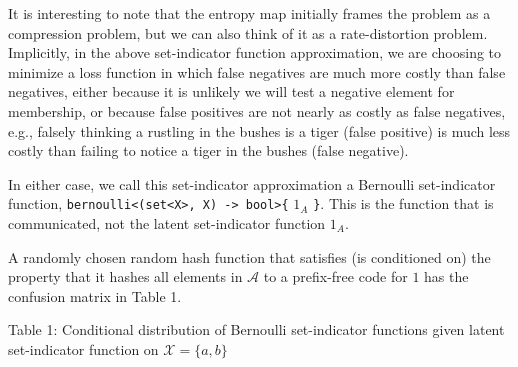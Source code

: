 \documentclass[
]{article}
\begin{document}
It is interesting to note that the entropy map initially frames the
problem as a compression problem, but we can also think of it as a
rate-distortion problem. Implicitly, in the above set-indicator function
approximation, we are choosing to minimize a loss function in which
false negatives are much more costly than false negatives, either
because it is unlikely we will test a negative element for membership,
or because false positives are not nearly as costly as false negatives,
e.g., falsely thinking a rustling in the bushes is a tiger (false
positive) is much less costly than failing to notice a tiger in the
bushes (false negative).

In either case, we call this set-indicator approximation a Bernoulli
set-indicator function,
\texttt{bernoulli\textless{}(set\textless{}X\textgreater{},\ X)\ -\textgreater{}\ bool\textgreater{}\{}
\(1_A\) \texttt{\}}. This is the function that is communicated, not the
latent set-indicator function \(1_A\).

A randomly chosen random hash function that satisfies (is conditioned
on) the property that it hashes all elements in \(\mathcal{A}\) to a
prefix-free code for \(1\) has the confusion matrix in Table 1.

Table 1: Conditional distribution of Bernoulli set-indicator functions
given latent set-indicator function on \(\mathcal{X} = \{a,b\}\)
\end{document}

